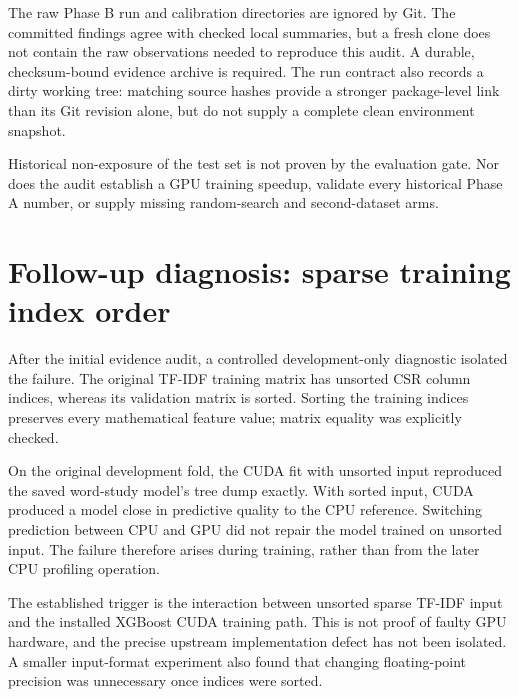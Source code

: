 \documentclass[12pt,a4paper]{article}
\begin{document}
The raw Phase B run and calibration directories are ignored by Git. The committed findings agree with checked local summaries, but a fresh clone does not contain the raw observations needed to reproduce this audit. A durable, checksum-bound evidence archive is required. The run contract also records a dirty working tree: matching source hashes provide a stronger package-level link than its Git revision alone, but do not supply a complete clean environment snapshot.

Historical non-exposure of the test set is not proven by the evaluation gate. Nor does the audit establish a GPU training speedup, validate every historical Phase A number, or supply missing random-search and second-dataset arms.

\section{Follow-up diagnosis: sparse training index order}
After the initial evidence audit, a controlled development-only diagnostic isolated the failure. The original TF-IDF training matrix has unsorted CSR column indices, whereas its validation matrix is sorted. Sorting the training indices preserves every mathematical feature value; matrix equality was explicitly checked.

On the original development fold, the CUDA fit with unsorted input reproduced the saved word-study model's tree dump exactly. With sorted input, CUDA produced a model close in predictive quality to the CPU reference. Switching prediction between CPU and GPU did not repair the model trained on unsorted input. The failure therefore arises during training, rather than from the later CPU profiling operation.

\begin{table}[htbp]\centering\small
\caption{Controlled diagnosis on the original development fold with fixed hyperparameters and seed. These new diagnostics are not replacement campaign results; no official test observations were scored. Values are bound to \texttt{diagnostic/root\_cause.json}.}
\end{table}

The established trigger is the interaction between unsorted sparse TF-IDF input and the installed XGBoost CUDA training path. This is not proof of faulty GPU hardware, and the precise upstream implementation defect has not been isolated. A smaller input-format experiment also found that changing floating-point precision was unnecessary once indices were sorted.
\end{document}
